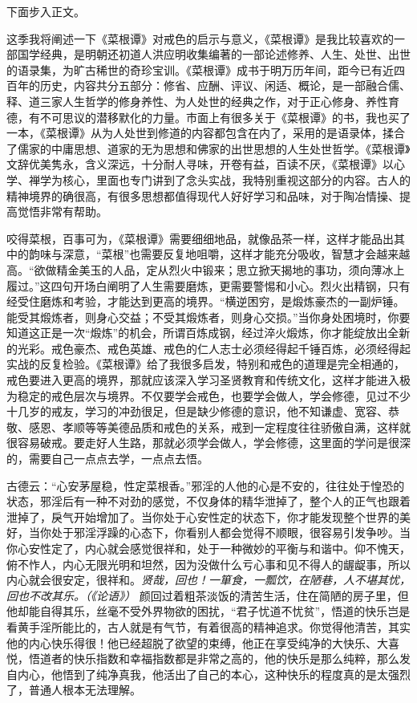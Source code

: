 下面步入正文。

这季我将阐述一下《菜根谭》对戒色的启示与意义，《菜根谭》是我比较喜欢的一部国学经典，是明朝还初道人洪应明收集编著的一部论述修养、人生、处世、出世的语录集，为旷古稀世的奇珍宝训。《菜根谭》成书于明万历年间，距今已有近四百年的历史，内容共分五部分：修省、应酬、评议、闲适、概论，是一部融合儒、释、道三家人生哲学的修身养性、为人处世的经典之作，对于正心修身、养性育德，有不可思议的潜移默化的力量。市面上有很多关于《菜根谭》的书，我也买了一本，《菜根谭》从为人处世到修道的内容都包含在内了，采用的是语录体，揉合了儒家的中庸思想、道家的无为思想和佛家的出世思想的人生处世哲学。《菜根谭》文辞优美隽永，含义深远，十分耐人寻味，开卷有益，百读不厌，《菜根谭》以心学、禅学为核心，里面也专门讲到了念头实战，我特别重视这部分的内容。古人的精神境界的确很高，有很多思想都值得现代人好好学习和品味，对于陶冶情操、提高觉悟非常有帮助。

咬得菜根，百事可为，《菜根谭》需要细细地品，就像品茶一样，这样才能品出其中的韵味与深意，“菜根”也需要反复地咀嚼，这样才能充分吸收，智慧才会越来越高。“欲做精金美玉的人品，定从烈火中锻来；思立掀天揭地的事功，须向薄冰上履过。”这四句开场白阐明了人生需要磨炼，更需要警惕和小心。烈火出精钢，只有经受住磨炼和考验，才能达到更高的境界。“横逆困穷，是煅炼豪杰的一副炉锤。能受其煅炼者，则身心交益；不受其煅炼者，则身心交损。”当你身处困境时，你要知道这正是一次“煅炼”的机会，所谓百炼成钢，经过淬火煅炼，你才能绽放出全新的光彩。戒色豪杰、戒色英雄、戒色的仁人志士必须经得起千锤百炼，必须经得起实战的反复检验。《菜根谭》给了我很多启发，特别和戒色的道理是完全相通的，戒色要进入更高的境界，那就应该深入学习圣贤教育和传统文化，这样才能进入极为稳定的戒色层次与境界。不仅要学会戒色，也要学会做人，学会修德，见过不少十几岁的戒友，学习的冲劲很足，但是缺少修德的意识，他不知谦虚、宽容、恭敬、感恩、孝顺等等美德品质和戒色的关系，戒到一定程度往往骄傲自满，这样就很容易破戒。要走好人生路，那就必须学会做人，学会修德，这里面的学问是很深的，需要自己一点点去学，一点点去悟。

古德云：“心安茅屋稳，性定菜根香。”邪淫的人他的心是不安的，往往处于惶恐的状态，邪淫后有一种不对劲的感觉，不仅身体的精华泄掉了，整个人的正气也跟着泄掉了，戾气开始增加了。当你处于心安性定的状态下，你才能发现整个世界的美好，当你处于邪淫浮躁的心态下，你看别人都会觉得不顺眼，很容易引发争吵。当你心安性定了，内心就会感觉很祥和，处于一种微妙的平衡与和谐中。仰不愧天，俯不怍人，内心无限光明和坦然，因为没做什么亏心事和见不得人的龌龊事，所以内心就会很安定，很祥和。\textit{贤哉，回也！一箪食，一瓢饮，在陋巷，人不堪其忧，回也不改其乐。（《论语》）} 颜回过着粗茶淡饭的清苦生活，住在简陋的房子里，但他却能自得其乐，丝毫不受外界物欲的困扰，“君子忧道不忧贫”，悟道的快乐岂是看黄手淫所能比的，古人就是有气节，有着很高的精神追求。你觉得他清苦，其实他的内心快乐得很！他已经超脱了欲望的束缚，他正在享受纯净的大快乐、大喜悦，悟道者的快乐指数和幸福指数都是非常之高的，他的快乐是那么纯粹，那么发自内心，他悟到了纯净真我，他活出了自己的本心，这种快乐的程度真的是太强烈了，普通人根本无法理解。


